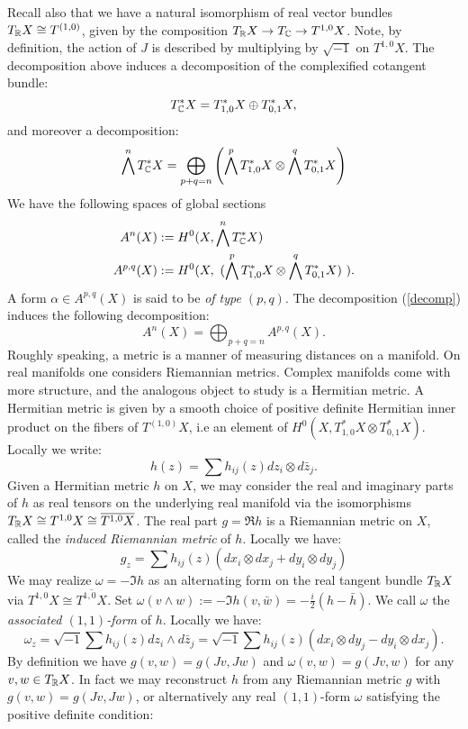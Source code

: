 Recall also that we have a natural isomorphism of real vector bundles \(T_{\mathbb{R}} X \cong T^{(1,0)}\), given by the composition \(T_{\mathbb{R}} X \to T_{\mathbb{C}} \to T^{1,0}X\). Note, by definition, the action of \(J\) is described by multiplying by \(\sqrt{-1}\) on \(T^{1,0} X\). The decomposition above induces a decomposition of the complexified cotangent bundle:
\[
T^*_{\mathbb{C}} X = T^*_{1,0} X \oplus T^*_{0,1} X,
\]
and moreover a decomposition:
\begin{equation} \label{decomp}
\bigwedge^n T^*_{\mathbb{C}} X = \bigoplus_{p+q = n} \left(\bigwedge^p T^*_{1,0} X \otimes \bigwedge^q T^*_{0,1} X   \right)
\end{equation}
We have the following spaces of global sections
\begin{align}
A^n(X) &:= H^0(X,\bigwedge^n T^*_{\mathbb{C}} X) \\
A^{p,q}(X) &:= H^0 ( X, \ (\bigwedge^p T^*_{1,0} X \otimes \bigwedge^q T^*_{0,1} X   ) \ ).
\end{align}
A form \(\alpha \in A^{p,q}(X)\) is said to be \textit{of type \((p,q)\)}. The decomposition (\ref{decomp}) induces the following decomposition:
\[
A^n(X) = \bigoplus_{p+q = n} A^{p,q}(X).
\]
Roughly speaking, a metric is a manner of measuring distances on a manifold. On real manifolds one considers Riemannian metrics. Complex manifolds come with more structure, and the analogous object to study is a Hermitian metric. A Hermitian metric is given by a smooth choice of positive definite Hermitian inner product on the fibers of \(T^{(1,0)}X\), i.e an element of \(H^0(X, T^*_{1,0} X \otimes T^*_{0,1} X) \). Locally we write:
\[
h(z) = \sum h_{ij}(z) dz_i \otimes d\bar{z}_j.
\]
Given a Hermitian metric \(h\) on \(X\), we may consider the real and imaginary parts of \(h\) as real tensors on the underlying real manifold via the isomorphisms \(T_{\mathbb{R}} X \cong T^{1,0}X \cong \overline{T^{1,0}X}\). The real part \(g = \Re h\) is a Riemannian metric on \(X\), called the \textit{induced Riemannian metric} of \(h\). Locally we have:
\[
g_z = \sum h_{ij}(z) ( dx_i \otimes d x_j + dy_i \otimes dy_j)
\]
We may realize \(\omega = - \Im h\) as an alternating form on the real tangent bundle \(T_{\mathbb{R}} X\) via \(T^{1,0}X \cong \overline{T^{1,0}X}\). Set \(\omega ( v \wedge w ) :=  - \Im h(v, \bar{w}) = - \frac{i}{2} ( h - \bar{h} )  \). We call \(\omega\) the \textit{associated \((1,1)\)-form} of \(h\). Locally we have:
\[
\omega_z = \sqrt{-1} \sum h_{ij}(z) dz_i \wedge d\bar{z}_j = \sqrt{-1} \sum h_{ij}(z) ( dx_i \otimes dy_j - dy_i \otimes dx_j). 
\]
By definition we have \(g(v,w) = g(Jv,Jw)\) and \(\omega(v,w) = g(Jv,w) \) for any \(v,w \in T_{\mathbb{R}} X\). In fact we may reconstruct \(h\) from any Riemannian metric \(g\) with \(g(v,w) = g(Jv,Jw)\), or alternatively any real \((1,1)\)-form \(\omega\) satisfying the positive definite condition:
